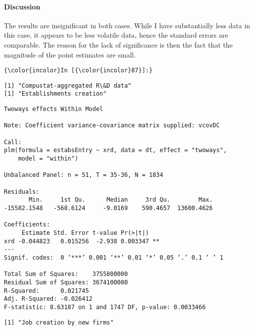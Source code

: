 \documentclass[11pt]{article}
\begin{document}
    
    \hypertarget{discussion}{%
\paragraph{Discussion}\label{discussion}}

The results are insignificant in both cases. While I have substantially
less data in this case, it appears to be less volatile data, hence the
standard errors are comparable. The reason for the lack of significance
is then the fact that the magnitude of the point estimates are small.

    \begin{Verbatim}[commandchars=\\\{\}]
{\color{incolor}In [{\color{incolor}87}]:} 
\end{Verbatim}


    \begin{Verbatim}[commandchars=\\\{\}]
[1] "Compustat-aggregated R\&D data"
[1] "Establishments creation"

    \end{Verbatim}

    
    \begin{verbatim}
Twoways effects Within Model

Note: Coefficient variance-covariance matrix supplied: vcovDC

Call:
plm(formula = estabsEntry ~ xrd, data = dt, effect = "twoways", 
    model = "within")

Unbalanced Panel: n = 51, T = 35-36, N = 1834

Residuals:
       Min.     1st Qu.      Median     3rd Qu.        Max. 
-15582.1548   -568.6124     -9.0169    590.4657  13600.4626 

Coefficients:
     Estimate Std. Error t-value Pr(>|t|)   
xrd -0.044823   0.015256  -2.938 0.003347 **
---
Signif. codes:  0 ‘***’ 0.001 ‘**’ 0.01 ‘*’ 0.05 ‘.’ 0.1 ‘ ’ 1

Total Sum of Squares:    3755800000
Residual Sum of Squares: 3674100000
R-Squared:      0.021745
Adj. R-Squared: -0.026412
F-statistic: 8.63187 on 1 and 1747 DF, p-value: 0.0033466
    \end{verbatim}

    
    \begin{Verbatim}[commandchars=\\\{\}]
[1] "Job creation by new firms"

    \end{Verbatim}
\end{document}

